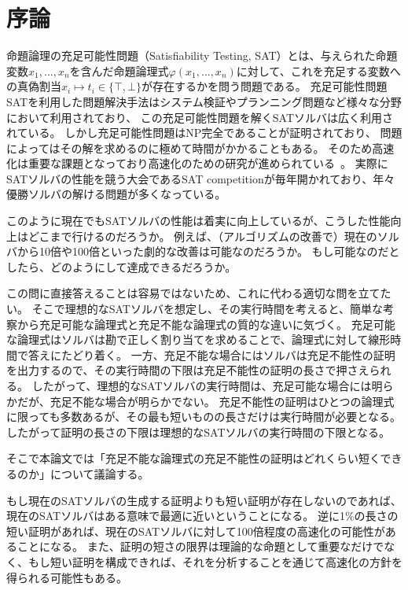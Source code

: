 \section{序論}
命題論理の充足可能性問題（Satisfiability Testing, SAT）とは、与えられた命題変数\( x_1,\dots,x_n \)を含んだ命題論理式\( \varphi(x_1,\dots,x_n) \)に対して、これを充足する変数への真偽割当\( x_i \mapsto t_i \in \{ \top, \bot \} \)が存在するかを問う問題である。
充足可能性問題SATを利用した問題解決手法はシステム検証やプランニング問題など様々な分野において利用されており、
この充足可能性問題を解くSATソルバは広く利用されている\cite{PracticalExample}。
しかし充足可能性問題はNP完全であることが証明されており\cite{Cook}、
問題によってはその解を求めるのに極めて時間がかかることもある。
そのため高速化は重要な課題となっており高速化のための研究が進められている~\cite{glucose,Chaff,BerkMin,MINISAT,kissat,neuralnet-vs-random-VSIDS}。
実際にSATソルバの性能を競う大会であるSAT competitionが毎年開かれており、年々優勝ソルバの解ける問題が多くなっている。

このように現在でもSATソルバの性能は着実に向上しているが、こうした性能向上はどこまで行けるのだろうか。
例えば、（アルゴリズムの改善で）現在のソルバから10倍や100倍といった劇的な改善は可能なのだろうか。
もし可能なのだとしたら、どのようにして達成できるだろうか。

この問に直接答えることは容易ではないため、これに代わる適切な問を立てたい。
そこで理想的なSATソルバを想定し、その実行時間を考えると、簡単な考察から充足可能な論理式と充足不能な論理式の質的な違いに気づく。
充足可能な論理式はソルバは勘で正しく割り当てを求めることで、論理式に対して線形時間で答えにたどり着く。
一方、充足不能な場合にはソルバは充足不能性の証明を出力するので、その実行時間の下限は充足不能性の証明の長さで押さえられる。
したがって、理想的なSATソルバの実行時間は、充足可能な場合には明らかだが、充足不能な場合が明らかでない。
充足不能性の証明はひとつの論理式に限っても多数あるが、その最も短いものの長さだけは実行時間が必要となる。
したがって証明の長さの下限は理想的なSATソルバの実行時間の下限となる。 

そこで本論文では「充足不能な論理式の充足不能性の証明はどれくらい短くできるのか」について議論する。
\begin{comment}
    さらに、短い証明を作ることは、ソルバの性能の限界に関する間接的な答えを与えることができる。
    SAT solverは充足不能な命題に対して充足不能性の証明を与えるため、
\end{comment}
もし現在のSATソルバの生成する証明よりも短い証明が存在しないのであれば、
現在のSATソルバはある意味で最適に近いということになる。
逆に1\%の長さの短い証明があれば、現在のSATソルバに対して100倍程度の高速化の可能性があることになる。
また、証明の短さの限界は理論的な命題として重要なだけでなく、もし短い証明を構成できれば、それを分析することを通じて高速化の方針を得られる可能性もある。

